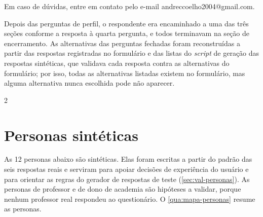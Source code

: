 \begin{apendicesenv}
\begin{citacao}
Em caso de dúvidas, entre em contato pelo e-mail
andreccoelho2004@gmail.com.
\end{citacao}

Depois das perguntas de perfil, o respondente era encaminhado a uma das
três seções conforme a resposta à quarta pergunta, e todos terminavam na
seção de encerramento. As alternativas das perguntas fechadas foram
reconstruídas a partir das respostas registradas no formulário e das
listas do \textit{script} de geração das respostas sintéticas, que
validava cada resposta contra as alternativas do formulário; por isso,
todas as alternativas listadas existem no formulário, mas alguma
alternativa nunca escolhida pode não aparecer.

{\small\SingleSpacing
\setlength{\columnsep}{0.8cm}
\begin{multicols}{2}

\end{multicols}
}

\chapter{Personas sintéticas}
\label{ap:personas}

As 12 personas abaixo são sintéticas. Elas foram escritas a partir do
padrão das seis respostas reais e serviram para apoiar decisões de
experiência do usuário e para orientar as regras do gerador de respostas
de teste (\autoref{sec:val-personas}). As personas de professor e de dono
de academia são hipóteses a validar, porque nenhum professor real
respondeu ao questionário. O \autoref{qua:mapa-personas} resume as
personas.


\end{apendicesenv}
